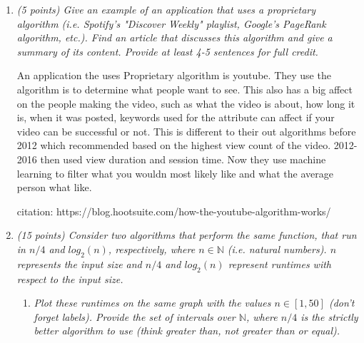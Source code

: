 \documentclass[12pt]{article}
\begin{document}
\begin{enumerate}


	\item\textit{	(5 points) Give an example of an application that uses a proprietary algorithm (i.e. Spotify's "Discover Weekly" playlist, Google's PageRank algorithm, etc.).  Find an article that discusses this algorithm and give a summary of its content.  Provide at least 4-5 sentences for full credit.}

An application the uses Proprietary algorithm is youtube. They use the algorithm is to determine what people want to see. This also has a big affect on the people making the video, such as what the video is about, how long it is, when it was posted, keywords used for the attribute can affect if your video can be successful or not. This is different to their out algorithms before 2012 which recommended based on the highest view count of the video. 2012-2016 then used view duration and session time. Now they use machine learning to filter what you wouldn most likely like and what the average person what like.

citation: https://blog.hootsuite.com/how-the-youtube-algorithm-works/

	\newpage

	\item\textit{ (15 points) Consider two algorithms that perform the same function, that run in  $n/4$ and $log_{2}(n)$, respectively, where $n \in \mathbb{N}$ (i.e. natural numbers). $n$ represents the input size and $n/4$ and $log_{2}(n)$ represent runtimes with respect to the input size.}

	\begin{enumerate}

	\item\textit{ \label{stocks:a} Plot these runtimes on the same graph with the values $n \in [1,50]$ (don't forget labels). Provide the set of intervals over $\mathbb{N}$, where $n/4$ is the strictly better algorithm to use (think greater than, not greater than or equal).}

	\end{enumerate}

\end{enumerate}
\end{document}
